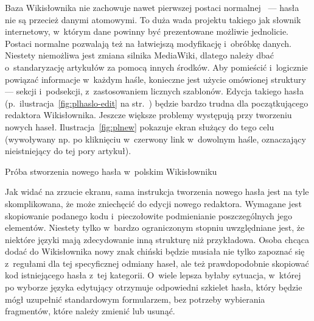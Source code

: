 Baza Wikisłownika nie zachowuje nawet pierwszej postaci normalnej~\cite{book:introduction} --- hasła nie są przecież danymi atomowymi. To duża wada projektu takiego jak słownik internetowy, w~którym dane powinny być prezentowane możliwie jednolicie. Postaci normalne pozwalają też na łatwiejszą modyfikację i~obróbkę danych. Niestety niemożliwa jest zmiana silnika MediaWiki, dlatego należy dbać o~standaryzację artykułów za pomocą innych środków. Aby pomieścić i~logicznie powiązać informacje w~każdym haśle, konieczne jest użycie omówionej struktury --- sekcji i~podsekcji, z~zastosowaniem licznych szablonów. Edycja takiego hasła (p.~ilustracja~\ref{fig:plhaslo-edit} na str.~\pageref{fig:plhaslo-edit}) będzie bardzo trudna dla początkującego redaktora Wikisłownika. Jeszcze większe problemy występują przy tworzeniu nowych haseł. Ilustracja~\ref{fig:plnew} pokazuje ekran służący do tego celu (wywoływany np. po kliknięciu w~czerwony link w~dowolnym haśle, oznaczający nieistniejący do tej pory artykuł).

\begin{illustration}
	\caption{Próba stworzenia nowego hasła w~polskim Wikisłowniku}
	\label{fig:plnew}
\end{illustration}

Jak widać na zrzucie ekranu, sama instrukcja tworzenia nowego hasła jest na tyle skomplikowana, że może zniechęcić do edycji nowego redaktora. Wymagane jest skopiowanie podanego kodu i~pieczołowite podmienianie poszczególnych jego elementów. Niestety tylko w~bardzo ograniczonym stopniu uwzględniane jest, że niektóre języki mają zdecydowanie inną strukturę niż przykładowa. Osoba chcąca dodać do Wikisłownika nowy znak chiński będzie musiała nie tylko zapoznać się z~regułami dla tej specyficznej odmiany haseł, ale też prawdopodobnie skopiować kod istniejącego hasła z~tej kategorii. O~wiele lepsza byłaby sytuacja, w~której po wyborze języka edytujący otrzymuje odpowiedni szkielet hasła, który będzie mógł uzupełnić standardowym formularzem, bez potrzeby wybierania fragmentów, które należy zmienić lub usunąć.

